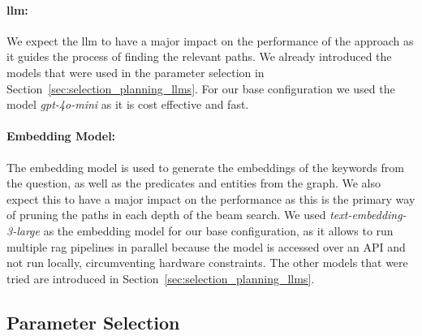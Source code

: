 \paragraph{\gls{llm}:} We expect the \gls{llm} to have a major impact on the performance of the approach as it guides the process of finding the relevant paths. We already introduced the models that were used in the parameter selection in Section~\ref{sec:selection_planning_llms}. For our base configuration we used the model \emph{gpt-4o-mini} as it is cost effective and fast.

\paragraph{Embedding Model:} The embedding model is used to generate the embeddings of the keywords from the question, as well as the predicates and entities from the graph. We also expect this to have a major impact on the performance as this is the primary way of pruning the paths in each depth of the beam search. We used \emph{text-embedding-3-large} as the embedding model for our base configuration, as it allows to run multiple \gls{rag} pipelines in parallel because the model is accessed over an API and not run locally, circumventing hardware constraints. The other models that were tried are introduced in Section~\ref{sec:selection_planning_llms}.

\subsection{Parameter Selection}

